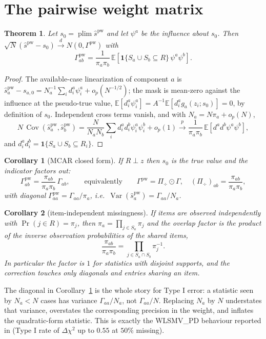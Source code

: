 \documentclass[11pt]{article}
\newcommand{\E}{\mathbb{E}}
\newcommand{\Var}{\operatorname{Var}}
\newcommand{\Cov}{\operatorname{Cov}}
\newcommand{\plim}{\operatorname*{plim}}
\newcommand{\one}{\mathbf{1}}
\newcommand{\pw}{\mathrm{pw}}
\theoremstyle{plain}
\newtheorem{theorem}{Theorem}
\newtheorem{corollary}{Corollary}
\theoremstyle{remark}
\begin{document}
\section*{The pairwise weight matrix}

\begin{theorem}\label{thm:gpw}
Let $s_0=\plim \hat s^{\pw}$ and let $\psi^a$ be the influence about $s_0$.
Then $\sqrt N(\hat s^{\pw}-s_0)\xrightarrow{d}N(0,\Gamma^{\pw})$ with
\[
  \Gamma^{\pw}_{ab}
  = \frac{1}{\pi_a\pi_b}\,
    \E\!\left[\one\{S_a\cup S_b\subseteq R\}\,\psi^a\psi^b\right].
\]
\end{theorem}

\begin{proof}
The available-case linearization of component $a$ is
$\hat s^{\pw}_a-s_{a,0}=N_a^{-1}\sum_i d^a_i\psi^a_i+o_p(N^{-1/2})$; the mask is
mean-zero against the influence at the pseudo-true value,
$\E[d^a_i\psi^a_i]=A^{-1}\E[d^a_i g_a(z_i;s_0)]=0$, by definition of $s_0$.
Independent cross terms vanish, and with $N_a=N\pi_a+o_p(N)$,
\[
  N\,\Cov(\hat s^{\pw}_a,\hat s^{\pw}_b)
  = \frac{N}{N_aN_b}\sum_i d^a_i d^b_i \psi^a_i\psi^b_i + o_p(1)
  \xrightarrow{p}
  \frac{1}{\pi_a\pi_b}\,\E[d^a d^b\psi^a\psi^b],
\]
and $d^a_id^b_i=\one\{S_a\cup S_b\subseteq R_i\}$.
\end{proof}

\begin{corollary}[MCAR closed form]\label{cor:mcar}
If $R\perp z$ then $s_0$ is the true value and the indicator factors out:
\[
  \Gamma^{\pw}_{ab}=\frac{\pi_{ab}}{\pi_a\pi_b}\,\Gamma_{ab},
  \qquad\text{equivalently}\qquad
  \Gamma^{\pw}=\Pi_{\!\div}\odot\Gamma,
  \quad
  (\Pi_{\!\div})_{ab}=\frac{\pi_{ab}}{\pi_a\pi_b},
\]
with diagonal $\Gamma^{\pw}_{aa}=\Gamma_{aa}/\pi_a$, i.e.\
$\Var(\hat s^{\pw}_a)=\Gamma_{aa}/N_a$.
\end{corollary}

\begin{corollary}[item-independent missingness]\label{cor:indep}
If items are observed independently with $\Pr(j\in R)=\pi_j$, then
$\pi_a=\prod_{j\in S_a}\pi_j$ and the overlap factor is the product of the
inverse observation probabilities of the \emph{shared} items,
\[
  \frac{\pi_{ab}}{\pi_a\pi_b}=\prod_{j\in S_a\cap S_b}\pi_j^{-1}.
\]
In particular the factor is $1$ for statistics with disjoint supports, and the
correction touches only diagonals and entries sharing an item.
\end{corollary}

The diagonal in Corollary~\ref{cor:mcar} is the whole story for Type I error:
a statistic seen by $N_a<N$ cases has variance $\Gamma_{aa}/N_a$, not
$\Gamma_{aa}/N$. Replacing $N_a$ by $N$ understates that variance, overstates
the corresponding precision in the weight, and inflates the quadratic-form
statistic. This is exactly the WLSMV{\_}PD behaviour reported in
\cite{chen2020} (Type I rate of $\Delta\chi^2$ up to $0.55$ at $50\%$ missing).
\end{document}

